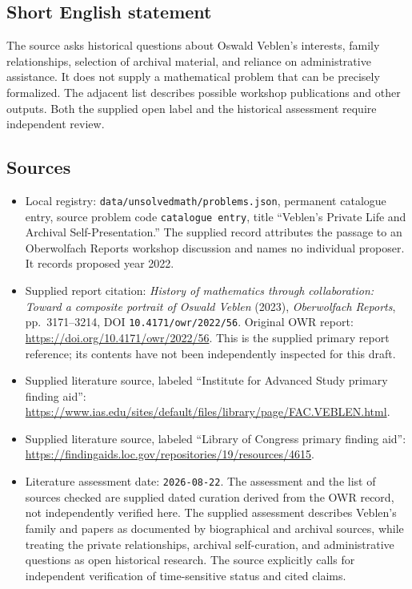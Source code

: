 \documentclass[11pt]{article}
\begin{document}
\subsection{Short English statement}
The source asks historical questions about Oswald Veblen's interests, family relationships, selection of archival material, and reliance on administrative assistance. It does not supply a mathematical problem that can be precisely formalized. The adjacent list describes possible workshop publications and other outputs. Both the supplied open label and the historical assessment require independent review.
\subsection{Sources}
\begin{itemize}
\item Local registry: \texttt{data/unsolvedmath/problems.json}, permanent catalogue entry, source problem code \texttt{catalogue entry}, title ``Veblen's Private Life and Archival Self-Presentation.'' The supplied record attributes the passage to an Oberwolfach Reports workshop discussion and names no individual proposer. It records proposed year 2022.
\item Supplied report citation: \emph{History of mathematics through collaboration: Toward a composite portrait of Oswald Veblen} (2023), \emph{Oberwolfach Reports}, pp.\ 3171--3214, DOI \texttt{10.4171/owr/2022/56}. Original OWR report: \url{https://doi.org/10.4171/owr/2022/56}. This is the supplied primary report reference; its contents have not been independently inspected for this draft.
\item Supplied literature source, labeled ``Institute for Advanced Study primary finding aid'': \url{https://www.ias.edu/sites/default/files/library/page/FAC.VEBLEN.html}.
\item Supplied literature source, labeled ``Library of Congress primary finding aid'': \url{https://findingaids.loc.gov/repositories/19/resources/4615}.
\item Literature assessment date: \texttt{2026-08-22}. The assessment and the list of sources checked are supplied dated curation derived from the OWR record, not independently verified here. The supplied assessment describes Veblen's family and papers as documented by biographical and archival sources, while treating the private relationships, archival self-curation, and administrative questions as open historical research. The source explicitly calls for independent verification of time-sensitive status and cited claims.
\end{itemize}
\end{document}

